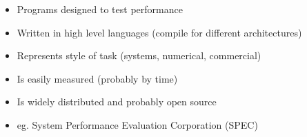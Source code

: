 \begin{itemize}
    \item Programs designed to test performance
    \item Written in high level languages (compile for different architectures)
    \item Represents style of task (systems, numerical, commercial)
    \item Is easily measured (probably by time)
    \item Is widely distributed and probably open source
    \item eg. System Performance Evaluation Corporation (SPEC)
\end{itemize}

